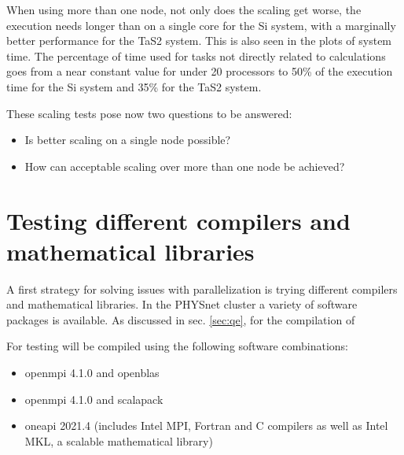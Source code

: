 \documentclass[main.tex]{subfiles}
\begin{document}
When using more than one node, not only does the scaling get worse, the execution needs longer than on a single core for the Si system, with a marginally better performance for the TaS2 system.
This is also seen in the plots of system time. The percentage of time used for tasks not directly related to calculations goes from a near constant value for under 20 processors to 50\% of the execution time for the Si system and 35\% for the TaS2 system.

These scaling tests pose now two questions to be answered:
\begin{itemize}
    \item Is better scaling on a single node possible?
    \item How can acceptable scaling over more than one node be achieved?
\end{itemize}

\section{Testing different compilers and mathematical libraries}

A first strategy for solving issues with parallelization is trying different compilers and mathematical libraries.
In the PHYSnet cluster a variety of software packages is available.
As discussed in sec. \ref{sec:qe}, for the compilation of \QE {}

For testing \QE will be compiled using the following software combinations:
\begin{itemize}
    \item \gls{openmpi} 4.1.0 and \gls{openblas}
    \item \gls{openmpi} 4.1.0 and \gls{scalapack}
    \item \gls{oneapi} 2021.4 (includes Intel MPI, Fortran and C compilers as well as Intel MKL, a scalable mathematical library)
\end{itemize}
\end{document}
